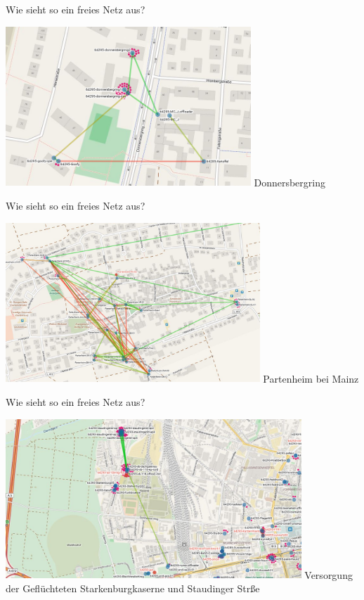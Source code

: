 \documentclass[10pt]{beamer}
\begin{document}
    \begin{frame}{Wie sieht so ein freies Netz aus?}
      \begin{center}
        \includegraphics[height=6cm]{images/2016-02-17_donnersbergring}
        \vfill Donnersbergring
      \end{center}
    \end{frame}

    \begin{frame}{Wie sieht so ein freies Netz aus?}
      \begin{center}
        \includegraphics[height=6cm]{images/2015-10_partenheim-map}
        \vfill Partenheim bei Mainz
      \end{center}
    \end{frame}

    \begin{frame}{Wie sieht so ein freies Netz aus?}
      \begin{center}
        \includegraphics[height=6cm]{images/2016-02-17_starkenburk-link}
        \vfill Versorgung der Geflüchteten
        \vfill \small Starkenburgkaserne und Staudinger Strße
      \end{center}
    \end{frame}
\end{document}

